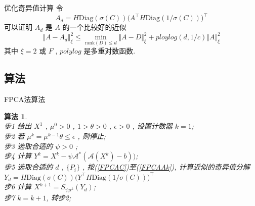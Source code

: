 \documentclass[slidestop,compress,mathserif,UTF8]{beamer}
\newtheorem{algo}{\bf \textcolor[rgb]{0.8,0,0}{算法}}
\numberwithin{equation}{section}
\begin{document}
            \begin{frame}[t]{优化奇异值计算}
                令
                \begin{equation}\label{FPCAAk}
                        A_d
                    =	H \text{Diag}(\sigma(C)) \big(A ^\top H \text{Diag}(1/\sigma(C))\big)^\top
                \end{equation}
                可以证明 $A_d$ 是 $A$ 的一个比较好的近似
                \begin{equation}
                        \Vert{A - A_d}\Vert^2_\xi 
                    \le	\min_{\text{rank}(D) \le d} \Vert{A - D}\Vert^2_\xi + ploylog(d, 1/c) \Vert{A}\Vert^2_\xi
                \end{equation}
                其中 $\xi = 2 \text{ 或 } F$ , $polylog$ 是多重对数函数.
            \end{frame}
        \subsection{算法}
            \begin{frame}[t]{FPCA法算法}
                \begin{algo}
                    \quad\\
                    步1 \quad 给出 $X^1$ , $\mu^0 > 0$ , $1 > \theta > 0$ , $\epsilon > 0$ , 设置计数器 $k = 1$;\\
                    步2 \quad 若 $\mu^k = \mu^{k -1} \theta \le \epsilon$ , 则停止;\\
                    步3 \quad 选取合适的 $\psi > 0$ ;\\
                    步4 \quad 计算 $Y^k = X^k - \psi \mathcal{A}^*(\mathcal{A}(X^k) - b))$;\\
                    步5 \quad 选取合适的 $d$ , $\{P_i\}$ , 按(\ref{FPCAC})至(\ref{FPCAAk}), 计算近似的奇异值分解 $Y_d = H \text{Diag}(\sigma(C)) \big(Y ^\top H \text{Diag}(1/\sigma(C))\big)^\top$\\
                    步6 \quad 计算 $X^{k + 1} = S_{\psi \mu^k}(Y_d)$;\\
                    步7 \quad $k = k + 1$, 转步2;
                \end{algo}
            \end{frame}
\end{document}
